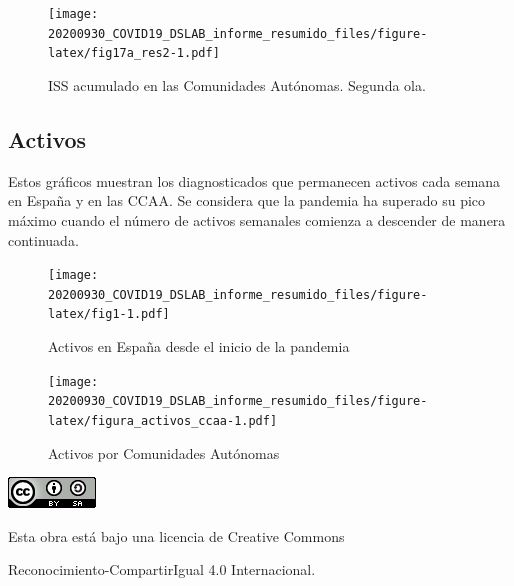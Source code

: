 \documentclass[
  11pt,
]{article}
\begin{document}
\vspace{0.2cm}

\begin{figure}
\centering
\texttt{[image: 20200930\_COVID19\_DSLAB\_informe\_resumido\_files/figure-latex/fig17a\_res2-1.pdf]}
\caption{\label{fig:fig17a_res} ISS acumulado en las Comunidades
Autónomas. Segunda ola.}
\end{figure}

\clearpage

\hypertarget{activos}{%
\subsection{Activos}\label{activos}}

Estos gráficos muestran los diagnosticados que permanecen activos cada
semana en España y en las CCAA. Se considera que la pandemia ha superado
su pico máximo cuando el número de activos semanales comienza a
descender de manera continuada.

\vspace{0.2cm}

\begin{figure}
\centering
\texttt{[image: 20200930\_COVID19\_DSLAB\_informe\_resumido\_files/figure-latex/fig1-1.pdf]}
\caption{\label{fig:fig17a_res} Activos en España desde el inicio de la
pandemia}
\end{figure}

\begin{figure}
\centering
\texttt{[image: 20200930\_COVID19\_DSLAB\_informe\_resumido\_files/figure-latex/figura\_activos\_ccaa-1.pdf]}
\caption{\label{fig:figura_activos_ccaa} Activos por Comunidades
Autónomas}
\end{figure}

\begin{center}
\includegraphics{cc.png}
\end{center}

\vspace{0.2cm}

\begin{center}
Esta obra está bajo una licencia de Creative Commons 
\end{center}

\begin{center}
Reconocimiento-CompartirIgual 4.0 Internacional.
\end{center}
\end{document}
